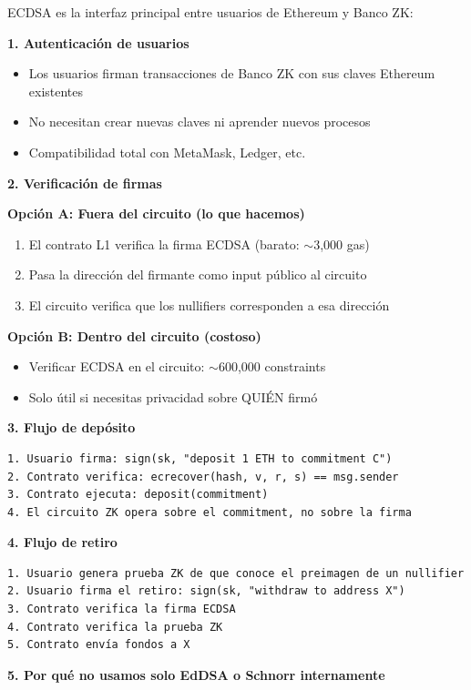 \documentclass[11pt,a4paper,twoside,openright]{book}
\theoremstyle{definition}
\theoremstyle{plain}
\theoremstyle{remark}
\begin{document}
\begin{bancozk}
ECDSA es la interfaz principal entre usuarios de Ethereum y Banco ZK:

\textbf{1. Autenticación de usuarios}
\begin{itemize}
    \item Los usuarios firman transacciones de Banco ZK con sus claves Ethereum existentes
    \item No necesitan crear nuevas claves ni aprender nuevos procesos
    \item Compatibilidad total con MetaMask, Ledger, etc.
\end{itemize}

\textbf{2. Verificación de firmas}

\textbf{Opción A: Fuera del circuito (lo que hacemos)}
\begin{enumerate}
    \item El contrato L1 verifica la firma ECDSA (barato: $\sim$3,000 gas)
    \item Pasa la dirección del firmante como input público al circuito
    \item El circuito verifica que los nullifiers corresponden a esa dirección
\end{enumerate}

\textbf{Opción B: Dentro del circuito (costoso)}
\begin{itemize}
    \item Verificar ECDSA en el circuito: $\sim$600,000 constraints
    \item Solo útil si necesitas privacidad sobre QUIÉN firmó
\end{itemize}

\textbf{3. Flujo de depósito}
\begin{verbatim}
1. Usuario firma: sign(sk, "deposit 1 ETH to commitment C")
2. Contrato verifica: ecrecover(hash, v, r, s) == msg.sender
3. Contrato ejecuta: deposit(commitment)
4. El circuito ZK opera sobre el commitment, no sobre la firma
\end{verbatim}

\textbf{4. Flujo de retiro}
\begin{verbatim}
1. Usuario genera prueba ZK de que conoce el preimagen de un nullifier
2. Usuario firma el retiro: sign(sk, "withdraw to address X")
3. Contrato verifica la firma ECDSA
4. Contrato verifica la prueba ZK
5. Contrato envía fondos a X
\end{verbatim}

\textbf{5. Por qué no usamos solo EdDSA o Schnorr internamente}


\end{bancozk}
\end{document}
